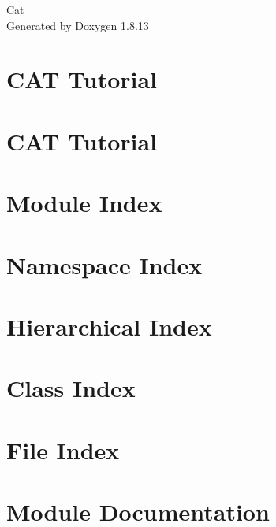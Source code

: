 \documentclass[twoside]{book}
\newcommand{\+}{\discretionary{\mbox{\scriptsize$\hookleftarrow$}}{}{}}
\newcommand{\clearemptydoublepage}{%
  \newpage{\pagestyle{empty}\cleardoublepage}%
}
\begin{document}
\hypersetup{pageanchor=false,
             bookmarksnumbered=true,
             pdfencoding=unicode
            }
\begin{titlepage}
\vspace*{7cm}
\begin{center}%
{\Large Cat }\\
\vspace*{1cm}
{\large Generated by Doxygen 1.8.13}\\
\end{center}
\end{titlepage}
\clearemptydoublepage
{}
\tableofcontents
\clearemptydoublepage
{}
\hypersetup{pageanchor=true}

\chapter{C\+AT Tutorial}
\label{index}\hypertarget{index}{}
\chapter{C\+AT Tutorial}
\label{tutorial}

\chapter{Module Index}

\chapter{Namespace Index}

\chapter{Hierarchical Index}

\chapter{Class Index}

\chapter{File Index}

\chapter{Module Documentation}

\end{document}

